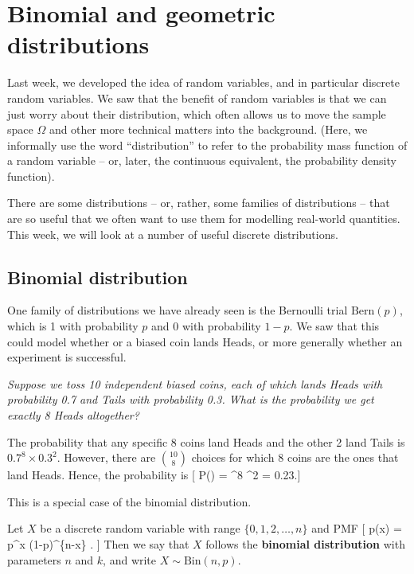 \documentclass[
  letterpaper,
  DIV=11,
  numbers=noendperiod]{scrreprt}
\theoremstyle{remark}
\begin{document}
\hypertarget{L11-binomial-poisson}{%
\chapter{Binomial and geometric
distributions}\label{L11-binomial-poisson}}

Last week, we developed the idea of random variables, and in particular
discrete random variables. We saw that the benefit of random variables
is that we can just worry about their distribution, which often allows
us to move the sample space \(\Omega\) and other more technical matters
into the background. (Here, we informally use the word ``distribution''
to refer to the probability mass function of a random variable -- or,
later, the continuous equivalent, the probability density function).

There are some distributions -- or, rather, some families of
distributions -- that are so useful that we often want to use them for
modelling real-world quantities. This week, we will look at a number of
useful discrete distributions.

\hypertarget{binomial}{%
\section{Binomial distribution}\label{binomial}}

One family of distributions we have already seen is the Bernoulli trial
\(\text{Bern}(p)\), which is 1 with probability \(p\) and 0 with
probability \(1-p\). We saw that this could model whether or a biased
coin lands Heads, or more generally whether an experiment is successful.

\emph{Suppose we toss 10 independent biased coins, each of which lands
Heads with probability 0.7 and Tails with probability 0.3. What is the
probability we get exactly 8 Heads altogether?}

The probability that any specific 8 coins land Heads and the other 2
land Tails is \(0.7^8\times 0.3^2\). However, there are
\(\binom{10}{8}\) choices for which 8 coins are the ones that land
Heads. Hence, the probability is {[} \mathbb P() =
 \^{}8 \^{}2 = 0.23.{]}

This is a special case of the binomial distribution.

Let \(X\) be a discrete random variable with range \(\{0,1,2,\dots,n\}\)
and PMF {[} p(x) =  p\^{}x (1-p)\^{}\{n-x\} . {]} Then we
say that \(X\) follows the \textbf{binomial distribution} with
parameters \(n\) and \(k\), and write \(X \sim \text{Bin}(n,p)\).
\end{document}

